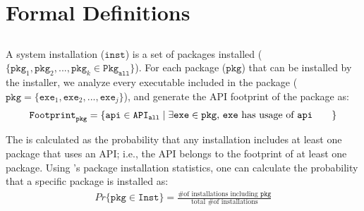 \chapter{Formal Definitions}
\label{chap:defs}


\section{\UsageMetric{}}
\label{sec:defs:usagemetric}


A system installation ($\mathtt{inst}$)
is a set of packages installed ($\{\mathtt{pkg}_1, \mathtt{pkg}_2, ..., \mathtt{pkg}_k \in \mathtt{Pkg}_\mathtt{all}\}$).
For each package ($\mathtt{pkg}$)  that can be installed by the installer,
we analyze every executable included in the package 
($\mathtt{pkg} = \{\mathtt{exe}_1, \mathtt{exe}_2, ..., \mathtt{exe}_j\}$), and
generate the API footprint of the package as:
\begin{align*}
{\mathtt{Footprint}}_{\mathtt{pkg}} = \{\mathtt{api} \in {\mathtt{API}}_{\mathtt{all}} \mid \text{\parbox{2.3in}{$\exists \mathtt{exe} \in \mathtt{pkg}$,
$\mathtt{exe}$ has usage of $\mathtt{api}$}}\}
\end{align*}

\noindent
The \usagemetric{} is calculated as the probability
that any installation includes
at least one package that uses an API;
i.e.,
the API belongs to the footprint of at least one package.
Using \osdist{}'s package installation statistics, one can calculate the
probability that a specific package is installed as:
\begin{align*}
Pr\{\mathtt{pkg} \in \mathtt{Inst}\} = \frac{\text{\# of installations including $\mathtt{pkg}$}}{\text{total \# of installations}}
\end{align*}

